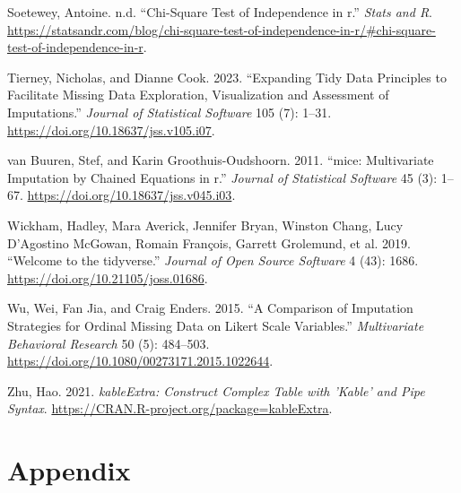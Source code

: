 \documentclass[
]{article}
\newlength{\cslhangindent}
\newlength{\cslentryspacingunit} %
\newenvironment{CSLReferences}[2] %
 {%
  \setlength{\parindent}{0pt}
  \ifodd #1
  \let\oldpar\par
  \def\par{\hangindent=\cslhangindent\oldpar}
  \fi
  \setlength{\parskip}{#2\cslentryspacingunit}
 }%
 {}
\begin{document}
\begin{CSLReferences}{1}{0}
\leavevmode{}%
Soetewey, Antoine. n.d. {``Chi-Square Test of Independence in r.''} \emph{Stats and R}. \url{https://statsandr.com/blog/chi-square-test-of-independence-in-r/\#chi-square-test-of-independence-in-r}.

\leavevmode{}%
Tierney, Nicholas, and Dianne Cook. 2023. {``Expanding Tidy Data Principles to Facilitate Missing Data Exploration, Visualization and Assessment of Imputations.''} \emph{Journal of Statistical Software} 105 (7): 1--31. \url{https://doi.org/10.18637/jss.v105.i07}.

\leavevmode{}%
van Buuren, Stef, and Karin Groothuis-Oudshoorn. 2011. {``{mice}: Multivariate Imputation by Chained Equations in r.''} \emph{Journal of Statistical Software} 45 (3): 1--67. \url{https://doi.org/10.18637/jss.v045.i03}.

\leavevmode{}%
Wickham, Hadley, Mara Averick, Jennifer Bryan, Winston Chang, Lucy D'Agostino McGowan, Romain François, Garrett Grolemund, et al. 2019. {``Welcome to the {tidyverse}.''} \emph{Journal of Open Source Software} 4 (43): 1686. \url{https://doi.org/10.21105/joss.01686}.

\leavevmode{}%
Wu, Wei, Fan Jia, and Craig Enders. 2015. {``A Comparison of Imputation Strategies for Ordinal Missing Data on Likert Scale Variables.''} \emph{Multivariate Behavioral Research} 50 (5): 484--503. \url{https://doi.org/10.1080/00273171.2015.1022644}.

\leavevmode{}%
Zhu, Hao. 2021. \emph{kableExtra: Construct Complex Table with 'Kable' and Pipe Syntax}. \url{https://CRAN.R-project.org/package=kableExtra}.

\end{CSLReferences}

\hypertarget{appendix-appendix}{%
\appendix}


\hypertarget{vartabfull}{%
\section{Appendix}\label{vartabfull}}
\end{document}
